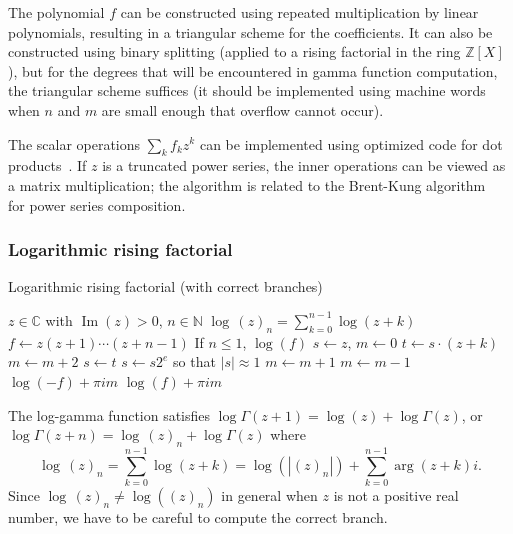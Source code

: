 \documentclass[reqno]{amsart}
\newcommand{\Real}{\operatorname{Re}}
\newcommand{\Imag}{\operatorname{Im}}
\newcommand{\ZZ}{\mathbb{Z}}
\newcommand{\NN}{\mathbb{N}}
\newcommand{\CC}{\mathbb{C}}
\theoremstyle{definition}
\begin{document}
The polynomial $f$
can be constructed using repeated multiplication by linear polynomials,
resulting in a triangular scheme for the coefficients.
It can also be constructed using binary splitting (applied
to a rising factorial in the ring $\ZZ[X]$), but for the degrees
that will be encountered in gamma function computation,
the triangular scheme suffices (it should be implemented using machine words when $n$ and $m$ are small enough
that overflow cannot occur).

The scalar operations $\sum_k f_k z^k$ can be implemented
using optimized code for dot products~\cite{Johansson2019}.
If $z$ is a truncated power series, the inner operations
can be viewed as a matrix multiplication; the algorithm is related to the
Brent-Kung algorithm~\cite{BrentKung1978} for power series composition.


\subsubsection{Logarithmic rising factorial}

\begin{algorithm}
\caption{Logarithmic rising factorial (with correct branches)}\label{alg:logrf}
\small
\begin{algorithmic}[1]
\Require $z \in \CC$ with $\operatorname{Im}(z) > 0$, $n \in \NN$
\Ensure $\log \, (z)_{n} = \sum_{k=0}^{n-1} \log(z+k)$
\State $f \gets z (z+1) \cdots (z+n-1)$ 
\State If $n \le 1$, \Return $\log(f)$
\State $s \gets z$, \; $m \gets 0$   
    \State $t \gets s \cdot (z+k)$ 
    \If{$\Imag(s) \ge 0$ and $\Imag(t) < 0$}
        \State $m \gets m + 2$
    \EndIf
    \State $s \gets t$
    \State $s \gets s 2^e$ so that $|s| \approx 1$ 
\EndFor
\If{$\Real(s) < 0$} %
    \If{$\Imag(s) \ge 0$}
        \State $m \gets m + 1$
    \Else
        \State $m \gets m - 1$
    \EndIf
    \State \Return $\log(-f) + \pi i m$
\Else
    \State \Return $\log(f) + \pi i m$
\EndIf
\end{algorithmic}
\end{algorithm}

The log-gamma function satisfies $\log \Gamma(z+1) = \log(z) + \log \Gamma(z)$,
or $\log \Gamma(z+n) = \log \, (z)_n + \log \Gamma(z)$ where
\begin{equation}
\log \, (z)_n = \sum_{k=0}^{n-1} \log(z+k) = \log(|(z)_n|) + \sum_{k=0}^{n-1} \arg(z+k) i.
\end{equation}
Since $\log \, (z)_n \ne \log((z)_n)$ in general when $z$ is not a positive real number,
we have to be careful to compute the correct branch.
\end{document}

